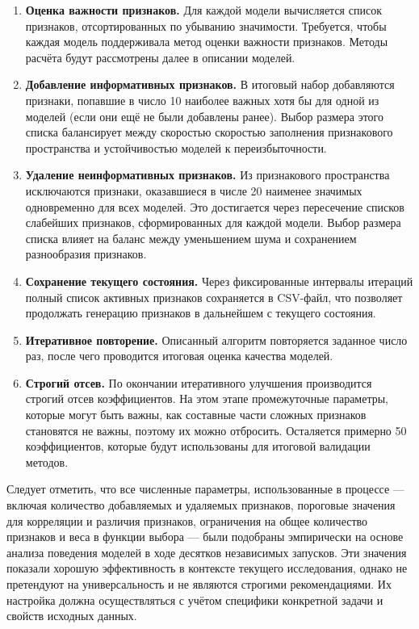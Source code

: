 \documentclass[a4paper,12pt]{article}
\begin{document}
\begin{enumerate}
      \item \textbf{Оценка важности признаков.}
      Для каждой модели вычисляется список признаков, отсортированных по убыванию значимости. Требуется, чтобы каждая модель поддерживала метод оценки важности признаков. Методы расчёта будут рассмотрены далее в описании моделей.
      
      \item \textbf{Добавление информативных признаков.}
      В итоговый набор добавляются признаки, попавшие в число 10 наиболее важных хотя бы для одной из моделей (если они ещё не были добавлены ранее). Выбор размера этого списка балансирует между скоростью скоростью заполнения признакового пространства и устойчивостью моделей к переизбыточности.
      
      \item \textbf{Удаление неинформативных признаков.}
      Из признакового пространства исключаются признаки, оказавшиеся в числе 20 наименее значимых одновременно для всех моделей. Это достигается через пересечение списков слабейших признаков, сформированных для каждой модели. Выбор размера списка влияет на баланс между уменьшением шума и сохранением разнообразия признаков.
      
      \item \textbf{Сохранение текущего состояния.}
      Через фиксированные интервалы итераций полный список активных признаков сохраняется в CSV-файл, что позволяет продолжать генерацию признаков в дальнейшем с текущего состояния.
      
      \item \textbf{Итеративное повторение.}
      Описанный алгоритм повторяется заданное число раз, после чего проводится итоговая оценка качества моделей.

      \item \textbf{Строгий отсев.}
      По окончании итеративного улучшения производится строгий отсев коэффициентов. На этом этапе промежуточные параметры, которые могут быть важны, как составные части сложных признаков становятся не важны, поэтому их можно отбросить. Осталяется примерно 50 коэффициентов, которые будут использованы для итоговой валидации методов.
    \end{enumerate}
    
    Следует отметить, что все численные параметры, использованные в процессе — включая количество добавляемых и удаляемых признаков, пороговые значения для корреляции и различия признаков, ограничения на общее количество признаков и веса в функции выбора — были подобраны эмпирически на основе анализа поведения моделей в ходе десятков независимых запусков. Эти значения показали хорошую эффективность в контексте текущего исследования, однако не претендуют на универсальность и не являются строгими рекомендациями. Их настройка должна осуществляться с учётом специфики конкретной задачи и свойств исходных данных.
\end{document}
